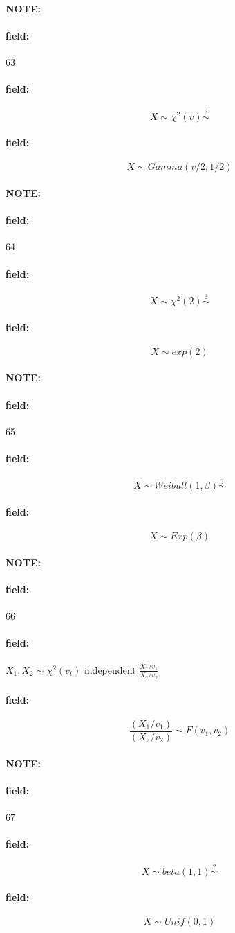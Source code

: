 \documentclass[12pt]{article}
\newenvironment{note}{\paragraph{NOTE:}}{}
\newenvironment{field}{\paragraph{field:}}{}
\begin{document}
\begin{note}
  \begin{field}
    \tiny 63
  \end{field}
  \begin{field}
    $$X \sim \chi^2(v) \overset{?}{\sim}$$
  \end{field}
  \begin{field}
    $$X \sim Gamma(v/2,1/2)$$

  \end{field}
\end{note}

\begin{note} \begin{field} \tiny 64 \end{field}
  \begin{field}
    $$ X \sim \chi^2(2) \overset{?}{\sim}$$
  \end{field}
  \begin{field}
    $$ X \sim exp(2)$$
  \end{field}
\end{note}

\begin{note} \begin{field} \tiny 65 \end{field}
  \begin{field}
    $$ X \sim Weibull(1,\beta) \overset{?}{\sim} $$
  \end{field}
  \begin{field}
    $$X \sim Exp(\beta)$$
  \end{field}
\end{note}


\begin{note} \begin{field} \tiny 66 \end{field}
  \begin{field}
    $X_1, X_2 \sim \chi^2(v_i)$ independent
    $ \frac{X_1/v_1}{X_2/v_2}$
  \end{field}
  \begin{field}
    $$ \frac{(X_1/v_1)}{(X_2/v_2)} \sim F(v_1,v_2)$$
  \end{field}
\end{note}



\begin{note} \begin{field} \tiny 67 \end{field}
  \begin{field}
    $$ X \sim beta(1,1) \overset{?}{\sim}$$
  \end{field}
  \begin{field}
    $$ X \sim Unif(0,1)$$
  \end{field}
\end{note}
\end{document}
